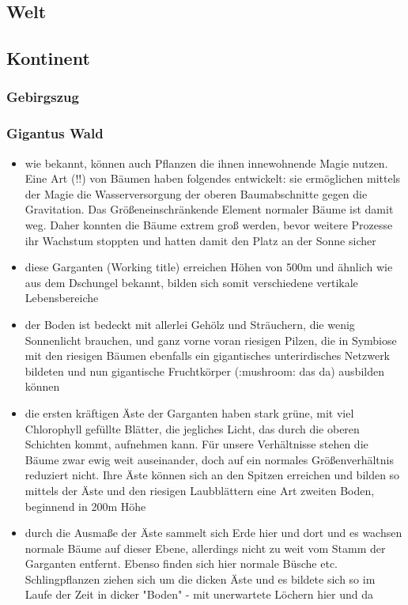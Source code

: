 \subsection{Welt}
\subsection{Kontinent}
\subsubsection{Gebirgszug}
\subsubsection{Gigantus Wald} \label{formation:gigantus}
\begin{itemize}
	\item wie bekannt, können auch Pflanzen die ihnen innewohnende Magie nutzen. Eine Art (!!) von Bäumen haben folgendes entwickelt: sie ermöglichen mittels der Magie die Wasserversorgung der oberen Baumabschnitte gegen die Gravitation. Das Größeneinschränkende Element normaler Bäume ist damit weg. Daher konnten die Bäume extrem groß werden, bevor weitere Prozesse ihr Wachstum stoppten und hatten damit den Platz an der Sonne sicher
	\item  diese Garganten (Working title) erreichen Höhen von 500m und ähnlich wie aus dem Dschungel bekannt, bilden sich somit verschiedene vertikale Lebensbereiche
	\item der Boden ist bedeckt mit allerlei Gehölz und Sträuchern, die wenig Sonnenlicht brauchen, und ganz vorne voran riesigen Pilzen, die in Symbiose mit den riesigen Bäumen ebenfalls ein gigantisches unterirdisches Netzwerk bildeten und nun gigantische Fruchtkörper (:mushroom:  das da) ausbilden können
	\item die ersten kräftigen Äste der Garganten haben stark grüne, mit viel Chlorophyll gefüllte Blätter, die jegliches Licht, das durch die oberen Schichten kommt, aufnehmen kann. Für unsere Verhältnisse stehen die Bäume zwar ewig weit auseinander, doch auf ein normales Größenverhältnis reduziert nicht. Ihre Äste können sich an den Spitzen erreichen und bilden so mittels der Äste und den riesigen Laubblättern eine Art zweiten Boden, beginnend in 200m Höhe
	\item durch die Ausmaße der Äste sammelt sich Erde hier und dort und es wachsen normale Bäume auf dieser Ebene, allerdings nicht zu weit vom Stamm der Garganten entfernt. Ebenso finden sich hier normale Büsche etc. Schlingpflanzen ziehen sich um die dicken Äste und es bildete sich so im Laufe der Zeit in dicker "Boden" - mit unerwartete Löchern hier und da

\end{itemize}
